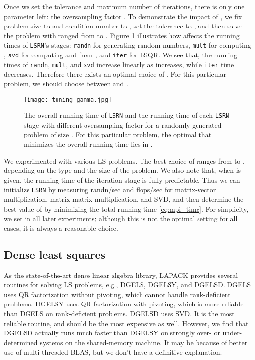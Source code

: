 \documentclass{siamltex}
\begin{document}
Once we set the tolerance and maximum number of iterations, there is only one
parameter left: the oversampling factor . To demonstrate the impact of
, we fix problem size to  and condition number to
, set the tolerance to , and then solve the problem with
 ranged from  to . Figure \ref{fig:tuning-s} illustrates how
 affects the running times of \texttt{LSRN}'s stages: \texttt{randn} for
generating random numbers, \texttt{mult} for computing ,
\texttt{svd} for computing  and  from ,
and \texttt{iter} for LSQR. We see that, the running times of \texttt{randn},
\texttt{mult}, and \texttt{svd} increase linearly as  increases, while
\texttt{iter} time decreases. Therefore there exists an optimal choice of
. For this particular problem, we should choose  between 
and .
\begin{figure}
  \centering
  \texttt{[image: tuning\_gamma.jpg]}
  \caption{The overall running time of \texttt{LSRN} and the running time of
    each \texttt{LSRN} stage with different oversampling factor  for a
    randomly generated problem of size . For this particular
    problem, the optimal  that minimizes the overall running time lies
    in .}
  \label{fig:tuning-s}
\end{figure}
We experimented with various LS problems.  The best choice of  ranges
from  to , depending on the type and the size of the problem. We also
note that, when  is given, the running time of the iteration stage is
fully predictable. Thus we can initialize \texttt{LSRN} by measuring randn/sec
and flops/sec for matrix-vector multiplication, matrix-matrix multiplication,
and SVD, and then determine the best value of  by minimizing the total
running time \eqref{eq:mpi_time}.  For simplicity, we set  in all
later experiments; although this is not the optimal setting for all cases, it is
always a reasonable choice.

\subsection{Dense least squares}
\label{sec:dense-lsq}

As the state-of-the-art dense linear algebra library, LAPACK provides several
routines for solving LS problems, e.g., DGELS, DGELSY, and
DGELSD. DGELS uses QR factorization without pivoting, which cannot handle
rank-deficient problems. DGELSY uses QR factorization with pivoting, which is
more reliable than DGELS on rank-deficient problems. DGELSD uses SVD. It is the
most reliable routine, and should be the most expensive as well. However, we
find that DGELSD actually runs much faster than DGELSY on strongly over- or
under-determined systems on the shared-memory machine. It may be because of
better use of multi-threaded BLAS, but we don't have a definitive explanation.
\end{document}
